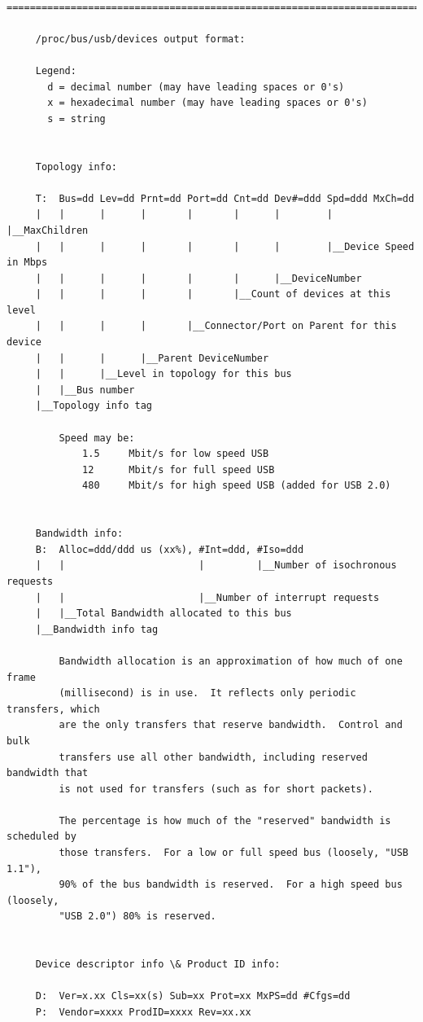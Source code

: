 {{{{{{{{{{{{{{{{{\begin{verbatim}
     =======================================================================
     
     /proc/bus/usb/devices output format:
     
     Legend:
       d = decimal number (may have leading spaces or 0's)
       x = hexadecimal number (may have leading spaces or 0's)
       s = string
     
     
     Topology info:
     
     T:  Bus=dd Lev=dd Prnt=dd Port=dd Cnt=dd Dev#=ddd Spd=ddd MxCh=dd
     |   |      |      |       |       |      |        |       |__MaxChildren
     |   |      |      |       |       |      |        |__Device Speed in Mbps
     |   |      |      |       |       |      |__DeviceNumber
     |   |      |      |       |       |__Count of devices at this level
     |   |      |      |       |__Connector/Port on Parent for this device
     |   |      |      |__Parent DeviceNumber
     |   |      |__Level in topology for this bus
     |   |__Bus number
     |__Topology info tag
     
         Speed may be:
             1.5     Mbit/s for low speed USB
             12      Mbit/s for full speed USB
             480     Mbit/s for high speed USB (added for USB 2.0)
     
     
     Bandwidth info:
     B:  Alloc=ddd/ddd us (xx%), #Int=ddd, #Iso=ddd
     |   |                       |         |__Number of isochronous requests
     |   |                       |__Number of interrupt requests
     |   |__Total Bandwidth allocated to this bus
     |__Bandwidth info tag
     
         Bandwidth allocation is an approximation of how much of one frame
         (millisecond) is in use.  It reflects only periodic transfers, which
         are the only transfers that reserve bandwidth.  Control and bulk
         transfers use all other bandwidth, including reserved bandwidth that
         is not used for transfers (such as for short packets).
     
         The percentage is how much of the "reserved" bandwidth is scheduled by
         those transfers.  For a low or full speed bus (loosely, "USB 1.1"),
         90% of the bus bandwidth is reserved.  For a high speed bus (loosely,
         "USB 2.0") 80% is reserved.
     
     
     Device descriptor info \& Product ID info:
     
     D:  Ver=x.xx Cls=xx(s) Sub=xx Prot=xx MxPS=dd #Cfgs=dd
     P:  Vendor=xxxx ProdID=xxxx Rev=xx.xx
     

\end{verbatim}}}}}}}}}}}}}}}}}}
